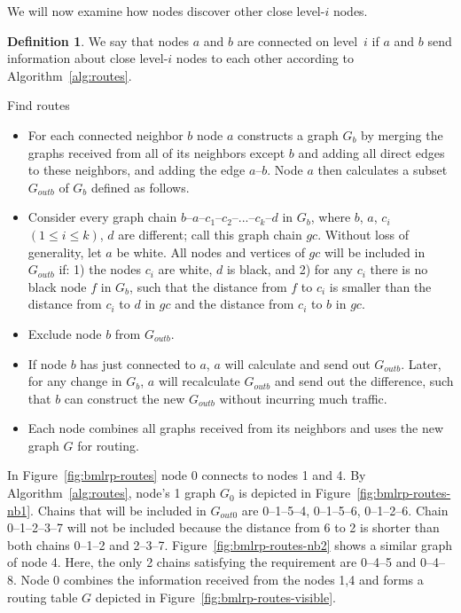 \documentclass[conference]{IEEEtran}
\theoremstyle{definition}
\newtheorem{defn}{Definition}
\begin{document}
We will now examine how nodes discover other close level-$i$ nodes.

\begin{defn}
    We say that nodes $a$ and $b$ are connected on level~$i$ if $a$ and $b$ send information about close level-$i$ nodes to each other according to Algorithm~\ref{alg:routes}.
    
    \label{defn:connected}
\end{defn}

\begin{algorithm}[H]
    \caption{Find routes}
    
    \begin{itemize} 

        \item   For each connected neighbor $b$ node $a$ constructs a graph $G_b$ by merging the graphs received from all of its neighbors except $b$ and adding all direct edges to these neighbors, and adding the edge $a$--$b$. Node $a$ then calculates a subset $G_{outb}$ of $G_b$ defined as follows.

        \item   Consider every graph chain $b$--$a$--$c_1$--$c_2$--...--$c_k$--$d$ in $G_b$, where $b$, $a$, $c_i$ $(1 \le i \le k)$, $d$ are different; call this graph chain $gc$. Without loss of generality, let $a$ be white. All nodes and vertices of $gc$ will be included in $G_{outb}$ if: 1) the nodes $c_i$ are white, $d$ is black, and 2) for any $c_i$ there is no black node $f$ in $G_b$, such that the distance from $f$ to $c_i$ is smaller than the distance from $c_i$ to $d$ in $gc$ and the distance from $c_i$ to $b$ in $gc$.

        \item   Exclude node $b$ from $G_{outb}$.

        \item   If node $b$ has just connected to $a$, $a$ will calculate and send out $G_{outb}$. Later, for any change in $G_b$, $a$ will recalculate $G_{outb}$ and send out the difference, such that $b$ can construct the new $G_{outb}$ without incurring much traffic.

        \item   Each node combines all graphs received from its neighbors and uses the new graph $G$ for routing.
    \end{itemize}

    \label{alg:routes}
\end{algorithm}

In Figure~\ref{fig:bmlrp-routes} node 0 connects to nodes 1 and 4. By Algorithm~\ref{alg:routes}, node's 1 graph $G_0$ is depicted in Figure~\ref{fig:bmlrp-routes-nb1}. Chains that will be included in $G_{out0}$ are 0--1--5--4, 0--1--5--6, 0--1--2--6. Chain 0--1--2--3--7 will not be included because the distance from 6 to 2 is shorter than both chains 0--1--2 and 2--3--7. Figure~\ref{fig:bmlrp-routes-nb2} shows a similar graph of node 4. Here, the only 2 chains satisfying the requirement are 0--4--5 and 0--4--8. Node 0 combines the information received from the nodes 1,4 and forms a routing table $G$ depicted in Figure~\ref{fig:bmlrp-routes-visible}.
\end{document}
